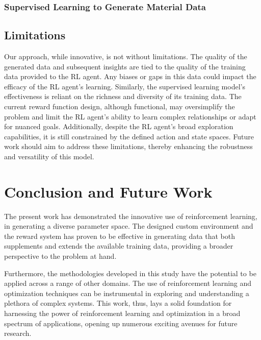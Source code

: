 \documentclass{article}
\begin{document}
\subsubsection{Supervised Learning to Generate Material Data}


\subsection{Limitations}

Our approach, while innovative, is not without limitations. The quality of the generated data and subsequent insights are tied to the quality of the training data provided to the RL agent. Any biases or gaps in this data could impact the efficacy of the RL agent's learning. Similarly, the supervised learning model's effectiveness is reliant on the richness and diversity of its training data. The current reward function design, although functional, may oversimplify the problem and limit the RL agent's ability to learn complex relationships or adapt for nuanced goals. Additionally, despite the RL agent's broad exploration capabilities, it is still constrained by the defined action and state spaces. Future work should aim to address these limitations, thereby enhancing the robustness and versatility of this model.

\section{Conclusion and Future Work}

The present work has demonstrated the innovative use of reinforcement learning, in generating a diverse parameter space. The designed custom environment and the reward system has proven to be effective in generating data that both supplements and extends the available training data, providing a broader perspective to the problem at hand.

Furthermore, the methodologies developed in this study have the potential to be applied across a range of other domains. The use of reinforcement learning and optimization techniques can be instrumental in exploring and understanding a plethora of complex systems. This work, thus, lays a solid foundation for harnessing the power of reinforcement learning and optimization in a broad spectrum of applications, opening up numerous exciting avenues for future research.





\end{document}
